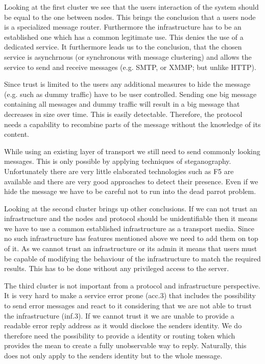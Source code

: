 \documentclass[12pt,journal,compsoc]{IEEEtran}
\begin{document}
Looking at the first cluster we see that the users interaction of the system should be equal to the one between nodes. This brings the conclusion that a users node is a specialized message router. Furthermore the infrastructure has to be an established one which has a common legitimate use. This denies the use of a dedicated service. It furthermore leads us to the conclusion, that the chosen service is asynchrnous (or synchronous with message clustering) and allows the service to send and receive messages (e.g. SMTP, or XMMP; but unlike HTTP). 
\par
Since trust is limited to the users any additional measures to hide the message (e.g. such as dummy traffic) have to be user controlled. Sending one big message containing all messages and dummy traffic will result in a big message that decreases in size over time. This is easily detectable. Therefore, the protocol needs a capability to recombine parts of the message without the knowledge of its content.
\par
While using an existing layer of transport we still need to send commonly looking messages. This is only possible by applying techniques of steganography. Unfortunately there are very little elaborated technologies such as F5\cite{f5} are available and there are very good approaches to detect their presence\cite{steganalysisf5}. Even if we hide the message we have to be careful not to run into the dead parrot problem\cite{oakland2013-parrot}.
\par
Looking at the second cluster brings up other conclusions. If we can not trust an infrastructure and the nodes and protocol should be unidentifiable then it means we have to use a common established infrastructure as a transport media. Since no such infrastructure has features mentioned above we need to add them on top of it. As we cannot trust an infrastructure or its admin it means that users must be capable of modifying the behaviour of the infrastructure to match the required results. This has to be done without any privileged access to the server.
\par
The third cluster is not important from a protocol and infrastructure perspective. It is very hard to make a service error prone (acc.3) that includes the possibility to send error messages and react to it considering that we are not able to trust the infrastructure (inf.3). If we cannot trust it we are unable to provide a readable error reply address as it would disclose the senders identity. We do therefore need the possibility to provide a identity or routing token which provides the mean to create a fully unobservable way to reply. Naturally, this does not only apply to the senders identity but to the whole message.
\end{document}
